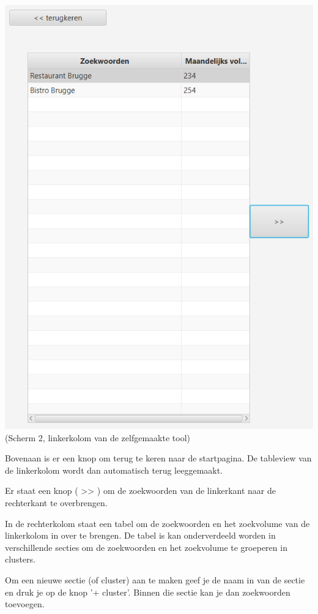 \includegraphics[width=\linewidth]{Bachelorproef/bachelor/img/scherm2linkerkant.PNG}
(Scherm 2, linkerkolom van de zelfgemaakte tool)

Bovenaan is er een knop om terug te keren naar de startpagina. De tableview van de linkerkolom wordt dan automatisch terug leeggemaakt. 

Er staat een knop ( >> ) om de zoekwoorden van de linkerkant naar de rechterkant te overbrengen. 

In de rechterkolom staat een tabel om de zoekwoorden en het zoekvolume van de linkerkolom in over te brengen. De tabel is kan onderverdeeld worden in verschillende secties om de zoekwoorden en het zoekvolume te groeperen in clusters. 

Om een nieuwe sectie (of cluster) aan te maken geef je de naam in van de sectie en druk je op de knop '+ cluster'. Binnen die sectie kan je dan zoekwoorden toevoegen.

